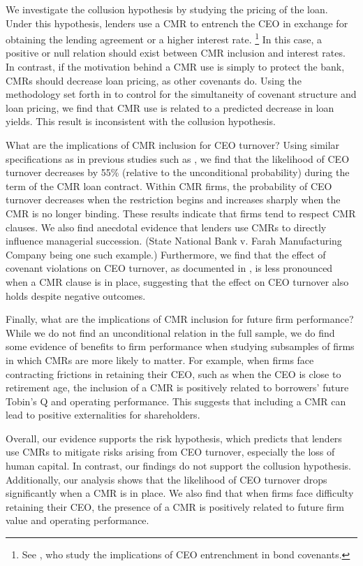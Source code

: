 \documentclass[a4paper,12pt]{article}
\begin{document}
We investigate the collusion hypothesis by studying the pricing of the loan.
Under this hypothesis, lenders use a CMR to entrench the CEO in exchange for obtaining the lending agreement or a higher interest rate.%
    \footnote{See \citet{chava_2010}, who study the implications of CEO entrenchment in bond covenants.}
In this case, a positive or null relation should exist between CMR inclusion and interest rates.
In contrast, if the motivation behind a CMR use is simply to protect the bank, CMRs should decrease loan pricing, as other covenants do.
Using the methodology set forth in \citet{Lee_1978} to control for the simultaneity of covenant structure and loan pricing, we find that CMR use is related to a predicted decrease in loan yields.
This result is inconsistent with the collusion hypothesis.




What are the implications of CMR inclusion for CEO turnover?
Using similar specifications as in previous studies such as \citet{Jenter_2015}, we find that the likelihood of CEO turnover decreases by 55\% (relative to the unconditional probability) during the term of the CMR loan contract.
Within CMR firms, the probability of CEO turnover decreases when the restriction begins and increases sharply when the CMR is no longer binding.
These results indicate that firms tend to respect CMR clauses.
We also find anecdotal evidence that lenders use CMRs to directly influence managerial succession.
(State National Bank v. Farah Manufacturing Company being one such example.)
Furthermore, we find that the effect of covenant violations on CEO turnover, as documented in \citet{Nini_2012}, is less pronounced when a CMR clause is in place, suggesting that the effect on CEO turnover also holds despite negative outcomes.




Finally,  what are the implications of CMR inclusion for future firm performance?
While we do not find an unconditional relation in the full sample, we do find some evidence of benefits to firm performance when studying subsamples of firms in which CMRs are more likely to matter.
For example, when firms face contracting frictions in retaining their CEO, such as when the CEO is close to retirement age, the inclusion of a CMR is positively related to borrowers' future Tobin's Q and operating performance.
This suggests that including a CMR can lead to positive externalities for shareholders.



Overall, our evidence supports the risk hypothesis, which predicts that lenders use CMRs to mitigate risks arising from CEO turnover, especially the loss of human capital.
In contrast, our findings do not support the collusion hypothesis.
Additionally, our analysis shows that
the likelihood of CEO turnover drops significantly when a CMR is in place.
We also find that when firms face difficulty retaining their CEO, the presence of a CMR is positively related to future firm value and operating performance.
\end{document}
